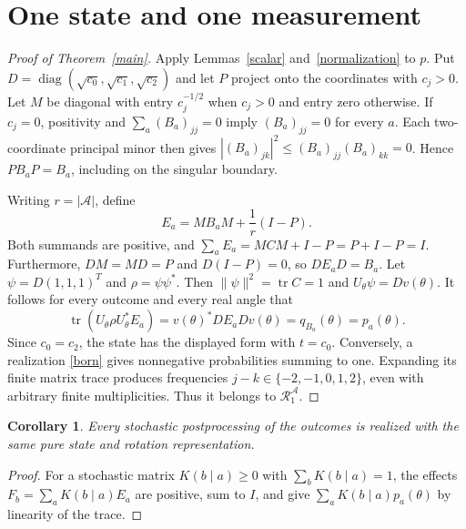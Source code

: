 \documentclass[11pt]{article}
\newtheorem{corollary}[theorem]{Corollary}
\newcommand{\tr}{\operatorname{tr}}
\newcommand{\diag}{\operatorname{diag}}
\begin{document}
\section{One state and one measurement}
\begin{proof}[Proof of Theorem~\ref{main}]
Apply Lemmas~\ref{scalar} and~\ref{normalization} to $p$.
Put $D=\diag(\sqrt{c_0},\sqrt{c_1},\sqrt{c_2})$ and let $P$ project onto
the coordinates with $c_j>0$. Let $M$ be diagonal with entry
$c_j^{-1/2}$ when $c_j>0$ and entry zero otherwise.
If $c_j=0$, positivity and $\sum_a(B_a)_{jj}=0$ imply
$(B_a)_{jj}=0$ for every $a$. Each two-coordinate principal minor then
gives $|(B_a)_{jk}|^2\leq(B_a)_{jj}(B_a)_{kk}=0$.
Hence $PB_aP=B_a$, including on the singular boundary.

Writing $r=|\mathcal A|$, define
\begin{equation}\label{effects}
 E_a=MB_aM+\frac1r(I-P).
\end{equation}
Both summands are positive, and
$\sum_aE_a=MCM+I-P=P+I-P=I$.
Furthermore, $DM=MD=P$ and $D(I-P)=0$, so
$DE_aD=B_a$.
Let $\psi=D(1,1,1)^T$ and $\rho=\psi\psi^*$.
Then $\|\psi\|^2=\tr C=1$ and $U_\theta\psi=Dv(\theta)$.
It follows for every outcome and every real angle that
\[
 \tr(U_\theta\rho U_\theta^*E_a)
 =v(\theta)^*DE_aDv(\theta)=q_{B_a}(\theta)=p_a(\theta).
\]
Since $c_0=c_2$, the state has the displayed form with $t=c_0$.
Conversely, a realization \eqref{born} gives nonnegative probabilities
summing to one. Expanding its finite matrix trace produces frequencies
$j-k\in\{-2,-1,0,1,2\}$, even with arbitrary finite multiplicities.
Thus it belongs to $\mathcal R_1^{\mathcal A}$.
\end{proof}

\begin{corollary}\label{postprocessing}
Every stochastic postprocessing of the outcomes is realized with the same
pure state and rotation representation.
\end{corollary}
\begin{proof}
For a stochastic matrix $K(b\mid a)\geq0$ with $\sum_bK(b\mid a)=1$,
the effects $F_b=\sum_aK(b\mid a)E_a$ are positive, sum to $I$, and give
$\sum_a K(b\mid a)p_a(\theta)$ by linearity of the trace.
\end{proof}
\end{document}

